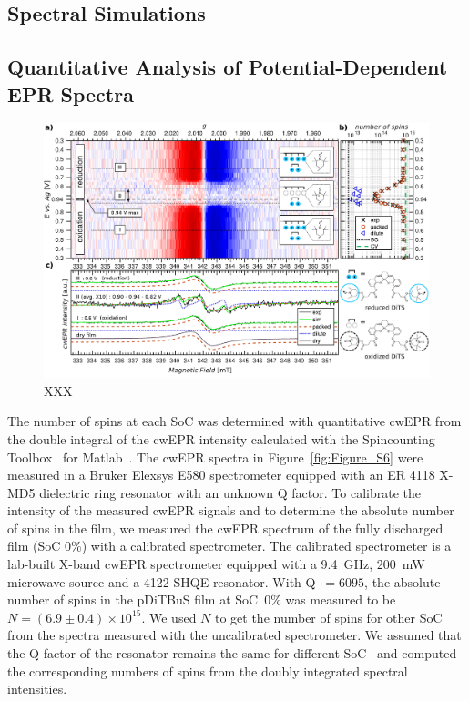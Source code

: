 \subsection{Spectral Simulations}

\subsection{Quantitative Analysis of Potential-Dependent EPR Spectra}
\label{sec:quantitative_EPR}
\begin{figure}[!ht]
\center
	\includegraphics[width=1\textwidth]{./operando_epr/figures/Main_2D_redox_map_full.pdf}
	\caption{XXX}
	\label{fig:operando_carpet}
\end{figure}
The number of spins at each SoC was determined with quantitative cwEPR from the double integral of the cwEPR intensity calculated with the Spincounting Toolbox~\cite{spin_counting_tb} for Matlab~\cite{SI:Matlab}. The cwEPR spectra in Figure~\ref{fig:Figure_S6} were measured in a Bruker Elexsys E580 spectrometer equipped with an ER 4118 X-MD5 dielectric ring resonator with an unknown Q factor. To calibrate the intensity of the measured cwEPR signals and to determine the absolute number of spins in the film, we measured the cwEPR spectrum of the fully discharged film (SoC 0\%) with a calibrated spectrometer. The calibrated spectrometer is a lab-built X-band cwEPR spectrometer equipped with a 9.4~GHz, 200~mW microwave source and a 4122-SHQE resonator. With Q~$=6095$, the absolute number of spins in the pDiTBuS film at SoC~0\% was measured to be $N=(6.9\pm0.4)\times10^{15}$. We used $N$ to get the number of spins for other SoC from the spectra measured with the uncalibrated spectrometer. We assumed that the Q factor of the resonator remains the same for different SoC~\cite{Kulikov2022_SI} and computed the corresponding numbers of spins from the doubly integrated spectral intensities.\\

